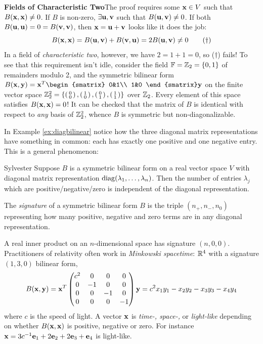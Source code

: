 \begin{aside}{}{}
	{\bfseries Fields of Characteristic Two}\quad The proof requires some ${\mathbf{x}}\in V$ such that $B({\mathbf{x}},{\mathbf{x}})\neq 0$. If $B$ is non-zero, $\exists{\mathbf{u}},{\mathbf{v}}$ such that $B({\mathbf{u}},{\mathbf{v}})\neq 0$. If both $B({\mathbf{u}},{\mathbf{u}})=0=B({\mathbf{v}},{\mathbf{v}})$, then ${\mathbf{x}}={\mathbf{u}}+{\mathbf{v}}$ looks like it does the job:
	\[
		B({\mathbf{x}},{\mathbf{x}})=B({\mathbf{u}},{\mathbf{v}})+B({\mathbf{v}},{\mathbf{u}})=2B({\mathbf{u}},{\mathbf{v}})\neq 0 \tag{\dag}
	\]
	In a field of \emph{characteristic two}, however, we have $2=1+1=0$, so ($\dag$) fails!\smallbreak
	To see that this requirement isn't idle, consider the field $\mathbb{F}=\mathbb{Z}_2=\{0,1\}$ of remainders modulo 2, and the symmetric bilinear form $B(\vx,\vy)=\vx^T
		\begin{smatrix}
			0&1\\
			1&0
		\end{smatrix}
		\vy$ on the finite vector space $\mathbb{Z}_2^2=\left\{\left(\begin{smallmatrix}0\\0\end{smallmatrix}\right),\left(\begin{smallmatrix}1\\0\end{smallmatrix}\right),\left(\begin{smallmatrix}0\\1\end{smallmatrix}\right),\left(\begin{smallmatrix}1\\1\end{smallmatrix}\right)\right\}$ over $\mathbb{Z}_2$. Every element of this space satisfies $B({\mathbf{x}},{\mathbf{x}})=0$! It can be checked that the matrix of $B$ is identical with respect to \emph{any} basis of $\mathbb{Z}_2^2$, whence $B$ is symmetric but non-diagonalizable.
\end{aside}


\pagebreak[3]



In Example \ref{ex:diagbilinear} notice how the three diagonal matrix representations have something in common: each has exactly one positive and one negative entry. This is a general phenomenon:

\begin{thm}{Sylvester}{}
	Suppose $B$ is a symmetric bilinear form on a real vector space $V$ with diagonal matrix representation $\operatorname{diag}(\lambda_1,\ldots,\lambda_n)$. Then the number of entries $\lambda_j$ which are positive/negative/zero is independent of the diagonal representation.
\end{thm}

\begin{defn}{}{}
	The \emph{signature} of a symmetric bilinear form $B$ is the triple $(n_+,n_-,n_0)$ representing how many positive, negative and zero terms are in any diagonal representation. %
\end{defn}

A real inner product on an $n$-dimensional space has signature $(n,0,0)$. Practitioners of relativity often work in \emph{Minkowski spacetime}: $\mathbb{R}^4$ with a signature $(1,3,0)$ bilinear form,
\[
	B({\mathbf{x}},{\mathbf{y}})={\mathbf{x}}^T
	\begin{pmatrix}
		c^2&0&0&0\\
		0&-1&0&0\\
		0&0&-1&0\\
		0&0&0&-1
	\end{pmatrix}
	{\mathbf{y}} =c^2x_1y_1-x_2y_2-x_3y_3-x_4y_4
\]
where $c$ is the speed of light. A vector ${\mathbf{x}}$ is \emph{time-, space-,} or \emph{light-like} depending on whether $B({\mathbf{x}},{\mathbf{x}})$ is positive, negative or zero. For instance ${\mathbf{x}}=3c^{-1}{\mathbf{e}}_1+2{\mathbf{e}}_2+2{\mathbf{e}}_3+{\mathbf{e}}_4$ is light-like.

